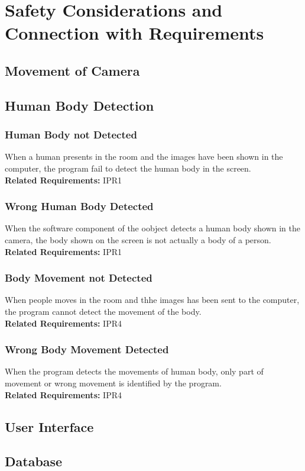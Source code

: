 \documentclass{article}
\begin{document}
\section{Safety Considerations and Connection with Requirements}
\subsection{Movement of Camera}
\subsection{Human Body Detection}
\subsubsection{Human Body not Detected}
When a human presents in the room and the images have been shown in the computer, the program fail to detect the human body in the screen. \\
\textbf{Related Requirements: }IPR1
\subsubsection{Wrong Human Body Detected}
When the software component of the oobject detects a human body shown in the camera, the body shown on the screen is not actually a body of a person.\\
\textbf{Related Requirements: }IPR1
\subsubsection{Body Movement not Detected}
When people moves in the room and thhe images has been sent to the computer, the program cannot detect the movement of the body.\\
\textbf{Related Requirements: }IPR4
\subsubsection{Wrong Body Movement Detected}
When the program detects the movements of human body, only part of movement or wrong movement is identified by the program.\\
\textbf{Related Requirements: }IPR4
\subsection{User Interface}
\subsection{Database}
\end{document}
